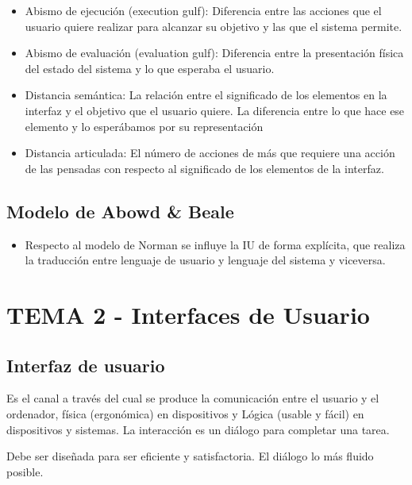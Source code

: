 \documentclass[12pt, twoside, openright]{report} %
\begin{document}
    \begin{itemize}
    
    \item
      Abismo de ejecución (execution gulf): Diferencia entre las
      acciones que el usuario quiere realizar para alcanzar su objetivo
      y las que el sistema permite.
    \item
      Abismo de evaluación (evaluation gulf): Diferencia entre la
      presentación física del estado del sistema y lo que esperaba el
      usuario.
    \item
      Distancia semántica: La relación entre el significado de los
      elementos en la interfaz y el objetivo que el usuario quiere. La
      diferencia entre lo que hace ese elemento y lo esperábamos por su
      representación
    \item
      Distancia articulada: El número de acciones de más que requiere
      una acción de las pensadas con respecto al significado de los
      elementos de la interfaz.
    \end{itemize}

\section{Modelo de Abowd \& Beale}

  \begin{itemize}
  
  \item
    Respecto al modelo de Norman se influye la IU de forma explícita,
    que realiza la traducción entre lenguaje de usuario y lenguaje del
    sistema y viceversa.
  \end{itemize}

\chapter{TEMA 2 - Interfaces de Usuario}

\section{Interfaz de usuario}

    Es el canal a través del cual se produce la comunicación entre el
    usuario y el ordenador, física (ergonómica) en dispositivos y Lógica
    (usable y fácil) en dispositivos y sistemas. La interacción es un
    diálogo para completar una tarea.

	Debe ser diseñada para ser eficiente y satisfactoria. El diálogo lo
    más fluido posible.
\end{document}

